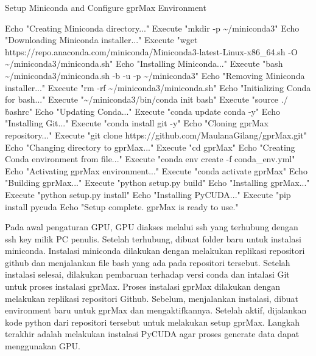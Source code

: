 \begin{algorithm}
\caption{Setup Miniconda and Configure gprMax Environment}
\begin{algorithmic}[1]
\State Echo "Creating Miniconda directory..."
\State Execute "mkdir -p \textasciitilde/miniconda3"
\State Echo "Downloading Miniconda installer..."
\State Execute "wget https://repo.anaconda.com/miniconda/Miniconda3-latest-Linux-x86\_64.sh -O \textasciitilde/miniconda3/miniconda.sh"
\State Echo "Installing Miniconda..."
\State Execute "bash \textasciitilde/miniconda3/miniconda.sh -b -u -p \textasciitilde/miniconda3"
\State Echo "Removing Miniconda installer..."
\State Execute "rm -rf \textasciitilde/miniconda3/miniconda.sh"
\State Echo "Initializing Conda for bash..."
\State Execute "\textasciitilde/miniconda3/bin/conda init bash"
\State Execute "source ./\.bashrc"
\State Echo "Updating Conda..."
\State Execute "conda update conda -y"
\State Echo "Installing Git..."
\State Execute "conda install git -y"
\State Echo "Cloning gprMax repository..."
\State Execute "git clone https://github.com/MaulanaGilang/gprMax.git"
\State Echo "Changing directory to gprMax..."
\State Execute "cd gprMax"
\State Echo "Creating Conda environment from file..."
\State Execute "conda env create -f conda\_env.yml"
\State Echo "Activating gprMax environment..."
\State Execute "conda activate gprMax"
\State Echo "Building gprMax..."
\State Execute "python setup.py build"
\State Echo "Installing gprMax..."
\State Execute "python setup.py install"
\State Echo "Installing PyCUDA..."
\State Execute "pip install pycuda
\State Echo "Setup complete. gprMax is ready to use."
\end{algorithmic}
\end{algorithm}

Pada awal pengaturan GPU, GPU diakses melalui ssh yang terhubung dengan ssh key milik PC penulis. Setelah terhubung, dibuat folder baru untuk instalasi miniconda. Instalasi miniconda dilakukan dengan melakukan replikasi repositori github dan menjalankan file bash yang ada pada repositori tersebut. Setelah instalasi selesai, dilakukan pembaruan terhadap versi conda dan intalasi Git untuk proses instalasi gprMax. Proses instalasi gprMax dilakukan dengan melakukan replikasi repositori Github. Sebelum, menjalankan instalasi, dibuat environment baru untuk gprMax dan mengaktifkannya. Setelah aktif, dijalankan kode python dari repositori tersebut untuk melakukan setup gprMax. Langkah terakhir adalah melakukan instalasi PyCUDA agar proses generate data dapat menggunakan GPU.

